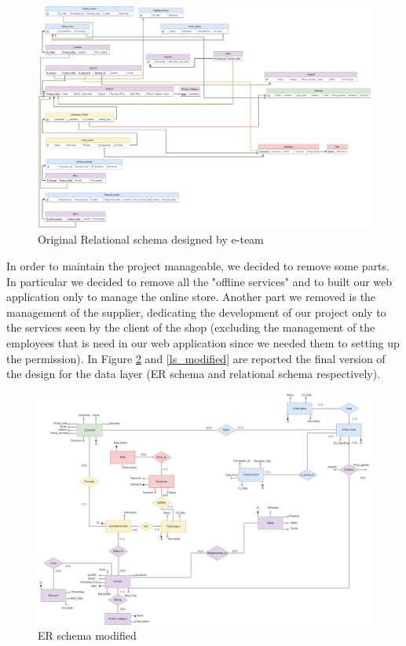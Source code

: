 \begin{figure}[H]
\centering
\includegraphics[width=16.5cm]{Schemas/LogicRS_original.jpg}
\caption{Original Relational schema designed by e-team}
\label{ls_original}
\end{figure}
\restoregeometry
In order to maintain the project manageable, we decided to remove some parts. In particular we decided to remove all the "offline services" and to built our web application only to manage the online store.
Another part we removed is the management of the supplier, dedicating the development of our project only to the services seen by the client of the shop (excluding the management of the employees that is need in our web application since we needed them to setting up the permission). In Figure \ref{er_modified} and \ref{ls_modified} are reported the final version of the design for the data layer (ER schema and relational schema respectively).

\begin{figure}[H]
\centering
\includegraphics[width=16.5cm]{Schemas/ER_modified.jpg}
\caption{ER schema modified}
\label{er_modified}
\end{figure}

